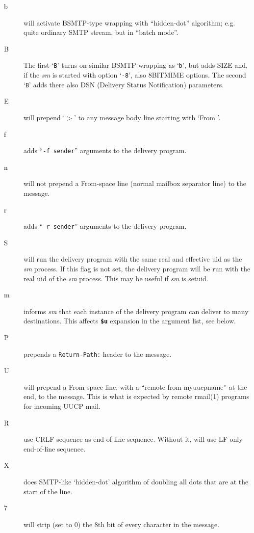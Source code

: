 \begin{description}
\item[b] \mbox{}

will activate BSMTP-type wrapping with ``hidden-dot''
algorithm; e.g. quite ordinary SMTP stream, but in
``batch mode''.



\item[B] \mbox{}

The first `{\tt B}' turns on similar BSMTP wrapping as
`{\tt b}', but adds SIZE and, if the {\em sm\/} is started with
option `{\tt -8}', also 8BITMIME options. The second `{\tt B}'
adds there also DSN (Delivery Status Notification)
parameters.



\item[E] \mbox{}
will prepend `{\(>\)}' to any message body line starting
with `From '.

\item[f] \mbox{}
adds ``{\tt -f sender}'' arguments to the delivery program.

\item[n] \mbox{}
will not prepend a From-space line (normal mailbox
separator line) to the message.

\item[r] \mbox{}
adds ``{\tt -r sender}'' arguments to the delivery program.

\item[S] \mbox{}
will run the delivery program with the same real
and effective uid as the {\em sm\/} process. If this flag
is not set, the delivery program will be run with
the real uid of the {\em sm\/} process. This may be useful
if {\em sm\/} is setuid.

\item[m] \mbox{}
informs {\em sm\/} that each instance of the delivery program 
can deliver to many destinations. This
affects {\bf {\tt \$u}} expansion in the argument list, see
below.

\item[P] \mbox{}
prepends a {\tt Return-Path:} header to the message.

\item[U] \mbox{}
will prepend a From-space line, with a ``remote from
myuucpname'' at the end, to the message. This is
what is expected by remote rmail(1) programs for
incoming UUCP mail.

\item[R] \mbox{}
use CRLF sequence as end-of-line sequence. Without it, will use 
LF-only end-of-line sequence.

\item[X] \mbox{}
does SMTP-like `hidden-dot' algorithm of doubling all dots that are 
at the start of the line.


\item[7] \mbox{}
will strip (set to 0) the 8th bit of every character in the message.

\end{description}


